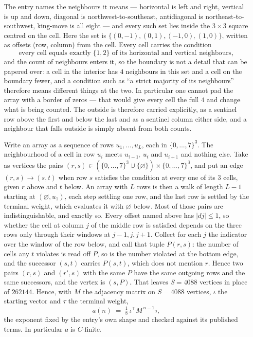 \documentclass[11pt,a4paper]{article}
\theoremstyle{plain}
\theoremstyle{definition}
\begin{document}
The entry names the neighbours it means --- horizontal is left and right, vertical is up and
down, diagonal is northwest-to-southeast, antidiagonal is northeast-to-southwest, king-move is
all eight --- and every such set lies inside the $3\times3$ square centred on the cell. Here
the set is $\{(0,-1), (0,1), (-1,0), (1,0)\}$, written as offsets (row, column) from the cell. Every cell carries
the condition
\[
\text{every cell equals exactly }\{1,2\}\text{ of its horizontal and vertical neighbours},
\]
and the count of neighbours enters it, so the boundary is not a detail that can be papered
over: a cell in the interior has $4$ neighbours in this set and a cell on the boundary
fewer, and a condition such as ``a strict majority of its neighbours'' therefore means
different things at the two. In particular one cannot pad the array with a border of zeros ---
that would give every cell the full $4$ and change what is being counted. The outside is
therefore carried
explicitly, as a sentinel row above the first and below the last and as a sentinel column
either side, and a neighbour that falls outside is simply absent from both counts.

Write an array as a sequence of rows $u_1,\dots,u_L$, each in
$\{0,\dots,7\}^{3}$. The neighbourhood of a cell in row $u_i$ meets $u_{i-1}$,
$u_i$ and $u_{i+1}$ and nothing else. Take as vertices the pairs
$(r,s)\in(\{0,\dots,7\}^{3}\cup\{\varnothing\})\times\{0,\dots,7\}^{3}$,
and put an edge $(r,s)\to(s,t)$ when row $s$ satisfies the condition at every one of its
$3$ cells, given $r$ above and $t$ below. An array with $L$ rows is then a walk of length
$L-1$ starting at $(\varnothing,u_1)$, each step settling one row, and the last row is
settled by the terminal weight, which evaluates it with $\varnothing$ below. Most of those pairs are indistinguishable, and exactly so. Every offset named above has $|dj|\le 1$, so whether the cell at column $j$ of the middle row is satisfied depends on the three rows only through their windows at $j-1,j,j+1$. Collect for each $j$ the indicator over the window of the row below, and call that tuple $P(r,s)$: the number of cells any $t$ violates is read off $P$, so is the number violated at the bottom edge, and the successor $(s,t)$ carries $P(s,t)$, which does not mention $r$. Hence two pairs $(r,s)$ and $(r',s)$ with the same $P$ have the same outgoing rows and the same successors, and the vertex is $(s,P)$. That leaves $S=4088$ vertices in place of $262144$. Hence,
with $M$ the adjacency matrix on $S=4088$ vertices, $\iota$ the starting vector and $\tau$ the
terminal weight,
\[
a(n)\;=\;\tfrac1{8}\,\iota^{\!\top}M^{\,n-1}\tau ,
\]
the exponent fixed by the entry's own shape and checked against its published terms. In
particular $a$ is $C$-finite.
\end{document}

